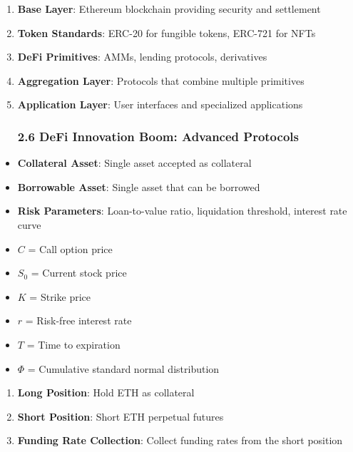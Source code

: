 \documentclass[12pt]{article}
\begin{document}
{{{\begin{enumerate}
\subsubsection{2.5 DeFi Summer: Uniswap, Aave, Compound, and the Foundation} %
	\item \textbf{Base Layer}: Ethereum blockchain providing security and settlement
	\item \textbf{Token Standards}: ERC-20 for fungible tokens, ERC-721 for NFTs
	\item \textbf{DeFi Primitives}: AMMs, lending protocols, derivatives
	\item \textbf{Aggregation Layer}: Protocols that combine multiple primitives
	\item \textbf{Application Layer}: User interfaces and specialized applications
\subsubsection{2.6 DeFi Innovation Boom: Advanced Protocols} %

\end{enumerate}
\begin{itemize}
	\item \textbf{Collateral Asset}: Single asset accepted as collateral
	\item \textbf{Borrowable Asset}: Single asset that can be borrowed
	\item \textbf{Risk Parameters}: Loan-to-value ratio, liquidation threshold, interest rate curve
	\item $C$ = Call option price
	\item $S_0$ = Current stock price
	\item $K$ = Strike price
	\item $r$ = Risk-free interest rate
	\item $T$ = Time to expiration
	\item $\Phi$ = Cumulative standard normal distribution

\end{itemize}
\begin{enumerate}
	\item \textbf{Long Position}: Hold ETH as collateral
	\item \textbf{Short Position}: Short ETH perpetual futures
	\item \textbf{Funding Rate Collection}: Collect funding rates from the short position

\end{enumerate}}}}
\end{document}
